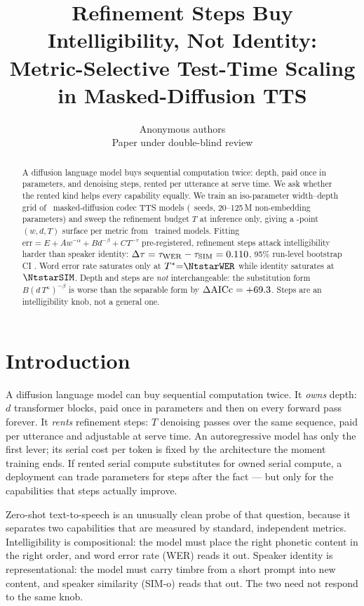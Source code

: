 \documentclass{article}
\title{Refinement Steps Buy Intelligibility, Not Identity:\\
Metric-Selective Test-Time Scaling in Masked-Diffusion TTS}
\author{Anonymous authors\\Paper under double-blind review}
\begin{document}
\maketitle

\begin{abstract}
A diffusion language model buys sequential computation twice: depth, paid once in
parameters, and denoising steps, rented per utterance at serve time. We ask whether the
rented kind helps every capability equally. We train an iso-parameter width--depth grid
of \Nconfigs\ masked-diffusion codec TTS models (\Nseeds\ seeds, 20--125\,M non-embedding
parameters) and sweep the refinement budget $T$ at inference only, giving a \Nsurface-point
$(w,d,T)$ surface per metric from \Nruns\ trained models. Fitting
$\mathrm{err}=E+Aw^{-\alpha}+Bd^{-\beta}+CT^{-\tau}$ pre-registered, refinement steps
attack intelligibility harder than speaker identity:
$\Delta\tau=\tau_{\mathrm{WER}}-\tau_{\mathrm{SIM}}=0.110$, 95\% run-level bootstrap CI
\Ndtauci. Word error rate saturates only at $T^{*}{=}\NtstarWER$ while identity saturates
at $\NtstarSIM$. Depth and steps are \emph{not} interchangeable: the substitution form
$B(d\,T^{\kappa})^{-\beta}$ is worse than the separable form by
$\Delta\mathrm{AICc}=+69.3$. Steps are an intelligibility knob, not a general one.
\end{abstract}

\section{Introduction}
A diffusion language model can buy sequential computation twice. It \emph{owns} depth:
$d$ transformer blocks, paid once in parameters and then on every forward pass forever.
It \emph{rents} refinement steps: $T$ denoising passes over the same sequence, paid per
utterance and adjustable at serve time. An autoregressive model has only the first lever;
its serial cost per token is fixed by the architecture the moment training ends. If rented
serial compute substitutes for owned serial compute, a deployment can trade parameters for
steps after the fact --- but only for the capabilities that steps actually improve.

Zero-shot text-to-speech is an unusually clean probe of that question, because it separates
two capabilities that are measured by standard, independent metrics. Intelligibility is
compositional: the model must place the right phonetic content in the right order, and word
error rate (WER) reads it out. Speaker identity is representational: the model must carry
timbre from a short prompt into new content, and speaker similarity (SIM-o) reads that out.
The two need not respond to the same knob.
\end{document}
